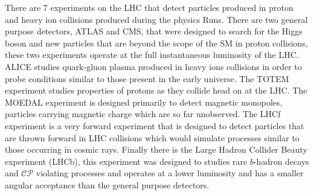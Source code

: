 There are 7 experiments on the LHC that detect particles produced in proton and heavy ion collisions produced during the physics Runs. There are two general purpose detectors, ATLAS and CMS, that were designed to search for the Higgs boson and new particles that are beyond the scope of the SM in proton collisions, these two experiments operate at the full instantaneous luminosity of the LHC. %
ALICE studies quark-gluon plasma produced in heavy ions collisions in order to probe conditions similar to those present in the early universe. The TOTEM experiment studies properties of protons as they collide head on at the LHC. The MOEDAL experiment is designed primarily to detect magnetic monopoles, particles carrying magnetic charge which are so far unobserved. The LHCf experiment is a very forward experiment that is designed to detect particles that are thrown forward in LHC collisions which would simulate processes similar to those occurring in cosmic rays. Finally there is the Large Hadron Collider Beauty experiment (LHCb), this experiment was designed to studies rare $b$-hadron decays and $\mathcal{CP}$ violating processes and operates at a lower luminosity and has a smaller angular acceptance than the general purpose detectors. %




